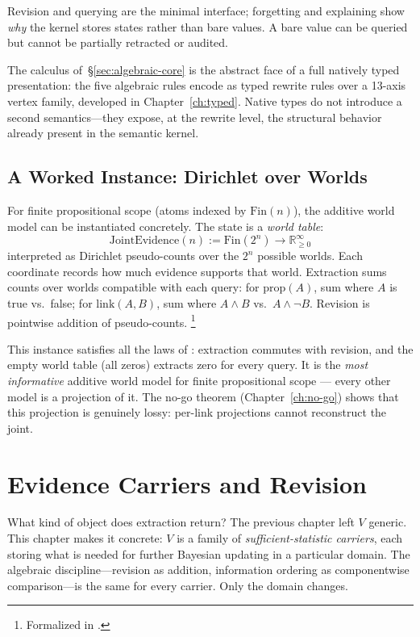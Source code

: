 \documentclass[11pt,openany]{report}
\begin{document}
\noindent
Revision and querying are the minimal interface; forgetting and
explaining show \emph{why} the kernel stores states rather than bare
values.  A bare value can be queried but cannot be partially retracted
or audited.

The calculus of~\S\ref{sec:algebraic-core} is
the abstract face of a full natively typed presentation: the five
algebraic rules encode as typed rewrite rules over a 13-axis vertex
family, developed in Chapter~\ref{ch:typed}.  Native types do not
introduce a second semantics---they expose, at the rewrite level, the
structural behavior already present in the semantic kernel.


\section{A Worked Instance: Dirichlet over Worlds}

For finite propositional scope (atoms indexed by $\mathrm{Fin}(n)$),
the additive world model can be instantiated concretely.  The state is
a \emph{world table}:
\[
  \mathrm{JointEvidence}(n) := \mathrm{Fin}(2^n) \to
  \mathbb{R}_{\ge 0}^{\infty}
\]
interpreted as Dirichlet pseudo-counts over the $2^n$ possible worlds.
Each coordinate records how much evidence supports that world.
Extraction sums counts over worlds compatible with each query:
for $\mathrm{prop}(A)$, sum where $A$ is true vs.\ false; for
$\mathrm{link}(A, B)$, sum where $A \wedge B$ vs.\ $A \wedge \neg B$.
Revision is pointwise addition of pseudo-counts.%
\footnote{Formalized in
.}

This instance satisfies all the laws of
: extraction commutes with revision, and the
empty world table (all zeros) extracts zero for every query.  It is
the \emph{most informative} additive world model for finite
propositional scope --- every other model is a projection of it.
The no-go theorem (Chapter~\ref{ch:no-go}) shows that this
projection is genuinely lossy: per-link projections cannot
reconstruct the joint.


\chapter{Evidence Carriers and Revision}
\label{ch:evidence}

What kind of object does extraction return?  The previous chapter left
$V$ generic.  This chapter makes it concrete: $V$ is a family of
\emph{sufficient-statistic carriers}, each storing what is needed for
further Bayesian updating in a particular domain.  The algebraic
discipline---revision as addition, information ordering as componentwise
comparison---is the same for every carrier.  Only the domain changes.
\end{document}
